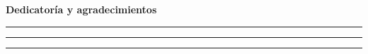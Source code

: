 \clearemptydoublepage
{}
{}

\vspace*{1.2cm}

\begin{center}
{\Large \textbf{Dedicatoría y agradecimientos}}
\end{center}

\vspace*{1.2cm}

\begin{center}


  \tinylipsum \tinylipsum

  \textit{\firstauthor}

  \rule{5cm}{0.1pt}


  \tinylipsum \tinylipsum

  \tinylipsum

  \textit{\secondauthor}

  \rule{5cm}{0.1pt}


  \tinylipsum \tinylipsum

  \textit{\thirthauthor}

  \rule{5cm}{0.1pt}


  \tinylipsum \tinylipsum \tinylipsum

  \textit{\fourthauthor}

\end{center}
